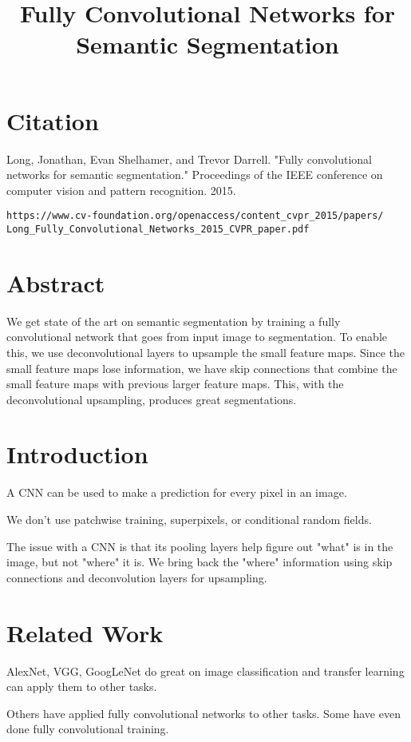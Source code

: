 \documentclass[a4paper]{article}
\title{Fully Convolutional Networks for Semantic Segmentation}
\date{}
\begin{document}
\maketitle

\section{Citation}
Long, Jonathan, Evan Shelhamer, and Trevor Darrell. "Fully convolutional networks for semantic segmentation." Proceedings of the IEEE conference on computer vision and pattern recognition. 2015.

\begin{verbatim}
https://www.cv-foundation.org/openaccess/content_cvpr_2015/papers/
Long_Fully_Convolutional_Networks_2015_CVPR_paper.pdf
\end{verbatim}

\section{Abstract}
We get state of the art on semantic segmentation by training a fully
convolutional network that goes from input image to segmentation. To enable
this, we use deconvolutional layers to upsample the small feature maps. Since
the small feature maps lose information, we have skip connections that
combine the small feature maps with previous larger feature maps. This,
with the deconvolutional upsampling, produces great segmentations.

\section{Introduction}
A CNN can be used to make a prediction for every pixel in an image.

We don't use patchwise training, superpixels, or conditional random fields.

The issue with a CNN is that its pooling layers help figure out "what" is in
the image, but not "where" it is. We bring back the "where" information using
skip connections and deconvolution layers for upsampling.

\section{Related Work}
AlexNet, VGG, GoogLeNet do great on image classification and transfer learning
can apply them to other tasks.

Others have applied fully convolutional networks to other tasks. Some have even
done fully convolutional training.
\end{document}
